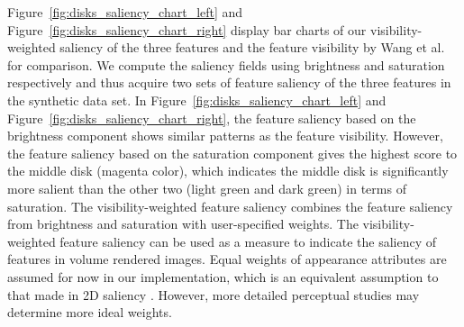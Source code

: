 Figure~\ref{fig:disks_saliency_chart_left} and Figure~\ref{fig:disks_saliency_chart_right} display bar charts of our visibility-weighted saliency of the three features and the feature visibility by Wang et al. \cite{wang_efficient_2011} for comparison.
We compute the saliency fields using brightness and saturation respectively and thus acquire two sets of feature saliency of the three features in the synthetic data set.
In Figure~\ref{fig:disks_saliency_chart_left} and Figure~\ref{fig:disks_saliency_chart_right}, the feature saliency based on the brightness component shows similar patterns as the feature visibility. However, the feature saliency based on the saturation component gives the highest score to the middle disk (magenta color), which indicates the middle disk is significantly more salient than the other two (light green and dark green) in terms of saturation. The visibility-weighted feature saliency combines the feature saliency from brightness and saturation with user-specified weights. 
The visibility-weighted feature saliency can be used as a measure to indicate the saliency of features in volume rendered images.
Equal weights of appearance attributes are assumed for now in our implementation, which is an equivalent assumption to that made in 2D saliency \cite{itti_model_1998}. However, more detailed perceptual studies may determine more ideal weights.

